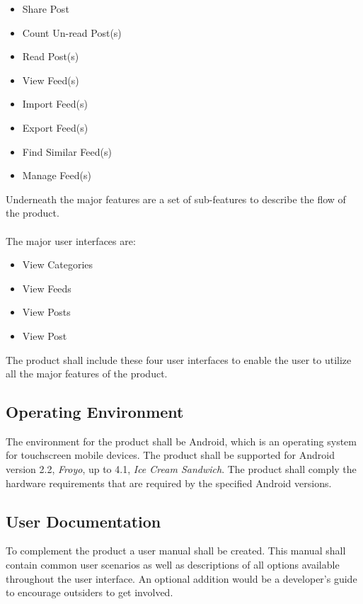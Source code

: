 \begin{itemize}
  \item Share Post
  \item Count Un-read Post(s)  
  \item Read Post(s)
  \item View Feed(s)
  \item Import Feed(s)
  \item Export Feed(s)
  \item Find Similar Feed(s)
  \item Manage Feed(s)
\end{itemize}
Underneath the major features are a set of sub-features to describe the flow of the product.\\ \\
The major user interfaces are:

\begin{itemize}
  \item View Categories
  \item View Feeds
  \item View Posts
  \item View Post
\end{itemize}
The product shall include these four user interfaces to enable the user to utilize all the major features of the product.


\subsection{Operating Environment}
The environment for the product shall be Android\cite{android}, which is an operating system for touchscreen mobile devices. The product shall be supported for Android version 2.2, \textit{Froyo}, up to 4.1, \textit{Ice Cream Sandwich}. The product shall comply the hardware requirements that are required by the specified Android versions. 


\subsection{User Documentation}
To complement the product a user manual shall be created. This manual shall contain common user scenarios as well as descriptions of all options available throughout the user interface. An optional addition would be a developer’s guide to encourage outsiders to get involved.

